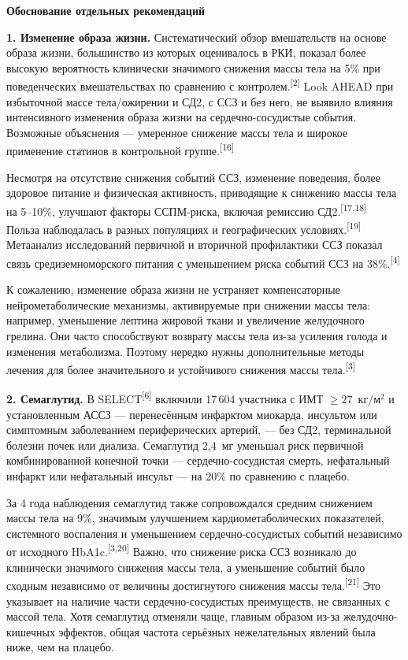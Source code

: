 \documentclass[11pt,a4paper]{article}
\newcommand{\src}[1]{\textsuperscript{[#1]}}
\newcommand{\heading}[1]{\par\medskip\textbf{#1}\par}
\begin{document}
\heading{Обоснование отдельных рекомендаций}
\textbf{1. Изменение образа жизни.} Систематический обзор вмешательств на основе образа жизни, большинство из которых оценивалось в РКИ, показал более высокую вероятность клинически значимого снижения массы тела на 5\% при поведенческих вмешательствах по сравнению с контролем.\src{2} Look AHEAD при избыточной массе тела/ожирении и СД2, с ССЗ и без него, не выявило влияния интенсивного изменения образа жизни на сердечно-сосудистые события. Возможные объяснения --- умеренное снижение массы тела и широкое применение статинов в контрольной группе.\src{16}

Несмотря на отсутствие снижения событий ССЗ, изменение поведения, более здоровое питание и физическая активность, приводящие к снижению массы тела на 5--10\%, улучшают факторы ССПМ-риска, включая ремиссию СД2.\src{17,18} Польза наблюдалась в разных популяциях и географических условиях.\src{19} Метаанализ исследований первичной и вторичной профилактики ССЗ показал связь средиземноморского питания с уменьшением риска событий ССЗ на 38\%.\src{4}

К сожалению, изменение образа жизни не устраняет компенсаторные нейрометаболические механизмы, активируемые при снижении массы тела: например, уменьшение лептина жировой ткани и увеличение желудочного грелина. Они часто способствуют возврату массы тела из-за усиления голода и изменения метаболизма. Поэтому нередко нужны дополнительные методы лечения для более значительного и устойчивого снижения массы тела.\src{3}

\textbf{2. Семаглутид.} В SELECT\src{6} включили 17\,604 участника с ИМТ $\geq27$~кг/м$^2$ и установленным АССЗ --- перенесённым инфарктом миокарда, инсультом или симптомным заболеванием периферических артерий, --- без СД2, терминальной болезни почек или диализа. Семаглутид 2,4~мг уменьшал риск первичной комбинированной конечной точки --- сердечно-сосудистая смерть, нефатальный инфаркт или нефатальный инсульт --- на 20\% по сравнению с плацебо.

За 4 года наблюдения семаглутид также сопровождался средним снижением массы тела на 9\%, значимым улучшением кардиометаболических показателей, системного воспаления и уменьшением сердечно-сосудистых событий независимо от исходного HbA1c.\src{3,20} Важно, что снижение риска ССЗ возникало до клинически значимого снижения массы тела, а уменьшение событий было сходным независимо от величины достигнутого снижения массы тела.\src{21} Это указывает на наличие части сердечно-сосудистых преимуществ, не связанных с массой тела. Хотя семаглутид отменяли чаще, главным образом из-за желудочно-кишечных эффектов, общая частота серьёзных нежелательных явлений была ниже, чем на плацебо.
\end{document}
